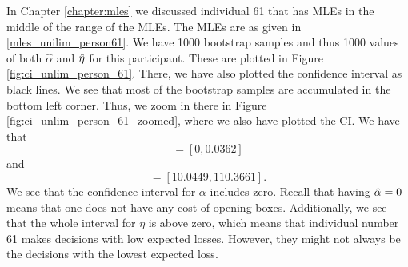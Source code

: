 In Chapter \ref{chapter:mles} we discussed individual 61 that has MLEs in the middle of the range of the MLEs. The MLEs are as given in \eqref{mles_unilim_person61}.
We have 1000 bootstrap samples and thus 1000 values of both $\hat{\alpha}$ and $\hat{\eta}$ for this participant. These are plotted in Figure \ref{fig:ci_unlim_person_61}. There, we have also plotted the confidence interval as black lines. We see that most of the bootstrap samples are accumulated in the bottom left corner. Thus, we zoom in there in Figure \ref{fig:ci_unlim_person_61_zoomed}, where we also have plotted the CI. We have that
\begin{equation*}
    [\hat{\alpha}^{*(5)}_{1000},\hat{\alpha}^{*(95)}_{1000}] = [0,0.0362]
\end{equation*}
and
\begin{equation*}
    [\hat{\eta}^{*(5)}_{1000},\hat{\eta}^{*(95)}_{1000}] = [10.0449,110.3661].
\end{equation*}
We see that the confidence interval for $\alpha$ includes zero. Recall that having $\hat{\alpha}=0$ means that one does not have any cost of opening boxes. Additionally, we see that the whole interval for $\eta$ is above zero, which means that individual number 61 makes decisions with low expected losses. However, they might not always be the decisions with the lowest expected loss. 


